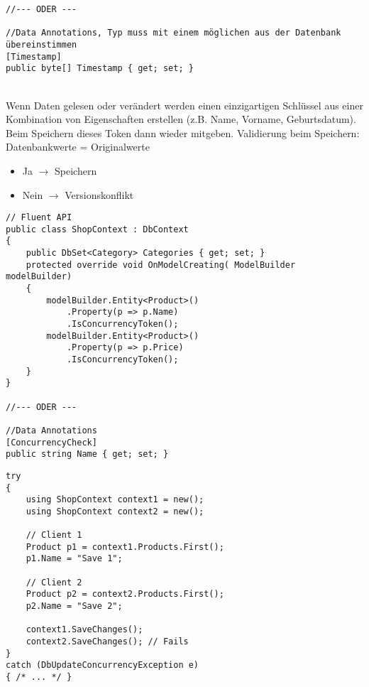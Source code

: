 \begin{multicols*}{2}
\begin{lstlisting}
//--- ODER ---

//Data Annotations, Typ muss mit einem möglichen aus der Datenbank übereinstimmen
[Timestamp]
public byte[] Timestamp { get; set; }
\end{lstlisting}
\\
Wenn Daten gelesen oder verändert werden einen einzigartigen Schlüssel aus einer Kombination von Eigenschaften erstellen (z.B. Name, Vorname, Geburtsdatum).
Beim Speichern dieses Token dann wieder mitgeben. Validierung beim Speichern: Datenbankwerte = Originalwerte
\begin{itemize}
    \item Ja $\rightarrow$ Speichern
    \item Nein $\rightarrow$ Versionskonflikt
\end{itemize}
\begin{lstlisting}
// Fluent API
public class ShopContext : DbContext
{
    public DbSet<Category> Categories { get; set; }
    protected override void OnModelCreating( ModelBuilder modelBuilder)
    { 
        modelBuilder.Entity<Product>() 
            .Property(p => p.Name) 
            .IsConcurrencyToken(); 
        modelBuilder.Entity<Product>() 
            .Property(p => p.Price) 
            .IsConcurrencyToken();
    }
}

//--- ODER ---

//Data Annotations
[ConcurrencyCheck]
public string Name { get; set; }
\end{lstlisting}
\begin{lstlisting}
try
{
    using ShopContext context1 = new();
    using ShopContext context2 = new();
    
    // Client 1
    Product p1 = context1.Products.First(); 
    p1.Name = "Save 1";
    
    // Client 2
    Product p2 = context2.Products.First();
    p2.Name = "Save 2";
    
    context1.SaveChanges();
    context2.SaveChanges(); // Fails
}
catch (DbUpdateConcurrencyException e)
{ /* ... */ }
\end{lstlisting}

\end{multicols*}

